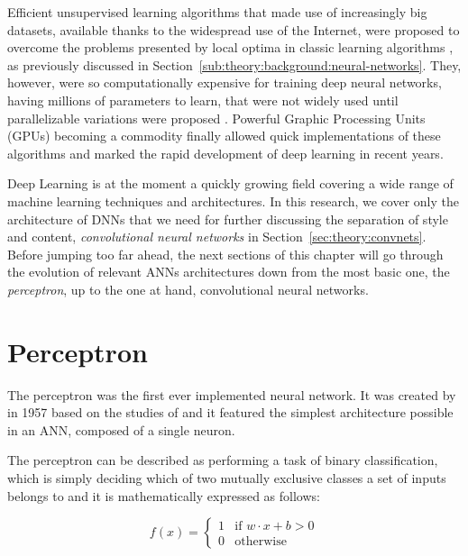 Efficient unsupervised learning algorithms that made use of increasingly big datasets, available thanks to the widespread use of the Internet, were proposed to overcome the problems presented by local optima in classic learning algorithms \cite{Bottou2004,Hinton2006}, as previously discussed in Section~\ref{sub:theory:background:neural-networks}.
They, however, were so computationally expensive for training deep neural networks, having millions of parameters to learn, that were not widely used until parallelizable variations were proposed \cite{Dean2012,Chen2012}.
Powerful Graphic Processing Units (GPUs) becoming a commodity finally allowed quick implementations of these algorithms and marked the rapid development of deep learning in recent years.

Deep Learning is at the moment a quickly growing field covering a wide range of machine learning techniques and architectures.
In this research, we cover only the architecture of DNNs that we need for further discussing the separation of style and content, \emph{convolutional neural networks} in Section~\ref{sec:theory:convnets}.
Before jumping too far ahead, the next sections of this chapter will go through the evolution of relevant ANNs architectures down from the most basic one, the \emph{perceptron}, up to the one at hand, convolutional neural networks.



\section{Perceptron}
\label{sec:theory:perceptron}

The perceptron was the first ever implemented neural network.
It was created by \citet{Rosenblatt1958} in 1957 based on the studies of \citet{McCulloch1943} and it featured the simplest architecture possible in an ANN, composed of a single neuron.

The perceptron can be described as performing a task of binary classification, which is simply deciding which of two mutually exclusive classes a set of inputs belongs to \cite{Freund1999} and it is mathematically expressed as follows:

$$
  f(x) =
  \begin{cases}
    1 & \text{if } {w}\cdot{x}+b > 0\\
    0 & \text{otherwise}
  \end{cases}
$$

